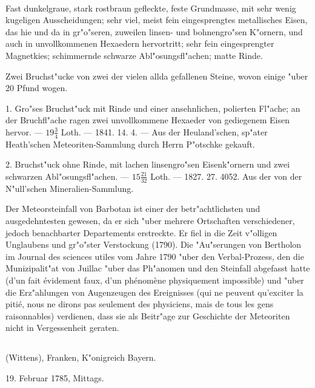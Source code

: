\documentclass[a4paper, 11pt, oneside, polutonikogreek, german]{article}
\begin{document}
\paragraph{}
Fast dunkelgraue, stark rostbraun gefleckte, feste Grundmasse, mit sehr wenig kugeligen Ausscheidungen; sehr viel, meist fein eingesprengtes metallisches Eisen, das hie und da in gr"o"seren, zuweilen linsen- und bohnengro"sen K"ornern, und auch in unvollkommenen Hexaedern hervortritt; sehr fein eingesprengter Magnetkies; schimmernde schwarze Abl"osungsfl"achen; matte Rinde.

Zwei Bruchst"ucke von zwei der vielen allda gefallenen Steine, wovon einige "uber 20 Pfund wogen.

1. Gro"ses Bruchst"uck mit Rinde und einer ansehnlichen, polierten Fl"ache; an der Bruchfl"ache ragen zwei unvollkommene Hexaeder von gediegenem Eisen hervor. --- $19\frac{3}{4}$ Loth. --- 1841. 14. 4. --- Aus der Heuland'schen, sp"ater Heath'schen Meteoriten-Sammlung durch Herrn P"otschke gekauft.

2. Bruchst"uck ohne Rinde, mit lachen linsengro"sen Eisenk"ornern und zwei schwarzen Abl"osungsfl"achen. --- $15\frac{21}{32}$ Loth. --- 1827. 27. 4052. Aus der von der N"ull'schen Mineralien-Sammlung.

\setlength{\leftskip}{10mm}
\setlength{\parindent}{0pt}

{\footnotesize Der Meteorsteinfall von Barbotan ist einer der betr"achtlichsten und ausgedehntesten gewesen, da er sich "uber mehrere Ortschaften verschiedener, jedoch benachbarter Departements erstreckte. Er fiel in die Zeit v"olligen Unglaubens und gr"o"ster Verstockung (1790). Die "Au"serungen von Bertholon im Journal des sciences utiles vom Jahre 1790 "uber den Verbal-Prozess, den die Munizipalit"at von Juillac "uber das Ph"anomen und den Steinfall abgefasst hatte (d'un fait évidement faux, d'un phénomène physiquement impossible) und "uber die Erz"ahlungen von Augenzeugen des Ereignisses (qui ne peuvent qu'exciter la pitié, nous ne dirons pas seulement des physiciens, mais de tous les gens raisonnables) verdienen, dass sie als Beitr"age zur Geschichte der Meteoriten nicht in Vergessenheit geraten.}

\setlength{\leftskip}{0pt}
\setlength{\parindent}{20pt}

\subsection{}
\begin{center}

(Wittens), Franken, K"onigreich Bayern.

19. Februar 1785, Mittags.
\end{center}
\end{document}
